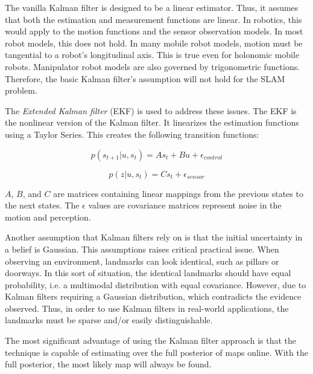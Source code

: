 \documentclass[10pt,conference]{ieeeconf}
\begin{document}
    The vanilla Kalman filter is designed to be a linear estimator. Thus, it assumes that both the estimation and measurement functions are linear. In robotics, this would apply to the motion functions and the sensor observation models. In most robot models, this does not hold. In many mobile robot models, motion must be tangential to a robot's longitudinal axis. This is true even for holonomic mobile robots. Manipulator robot models are also governed by trigonometric functions. Therefore, the basic Kalman filter's assumption will not hold for the SLAM problem.
    
    
    The \emph{Extended Kalman filter} (EKF) is used to address these issues. The EKF is the nonlinear version of the Kalman filter. It linearizes the estimation functions using a Taylor Series. This creates the following transition functions:
    
    \begin{equation}
    p(s_{t+1}|u,s_t) = As_t+Bu+\epsilon_{control}
    \label{nlm}
    \end{equation}
    
    \begin{equation}
    p(z|u,s_t) = Cs_t+\epsilon_{sensor}
    \label{nls}
    \end{equation}
    
	$A$, $B$, and $C$ are matrices containing linear mappings from the previous states to the next states. The $\epsilon$ values are covariance matrices represent noise in the motion and perception.
	
	Another assumption that Kalman filters rely on is that the initial uncertainty in a belief is Gaussian. This assumptions raises critical practical issue. When observing an environment, landmarks can look identical, such as pillars or doorways. In this sort of situation, the identical landmarks should have equal probability, i.e. a multimodal distribution with equal covariance. However, due to Kalman filters requiring a Gaussian distribution, which contradicts the evidence observed. Thus, in order to use Kalman filters in real-world applications, the landmarks must be sparse and/or easily distinguishable.  

    	The most significant advantage of using the Kalman filter approach is that the technique is capable of estimating over the full posterior of maps online. With the full posterior, the most likely map will always be found.
\end{document}
